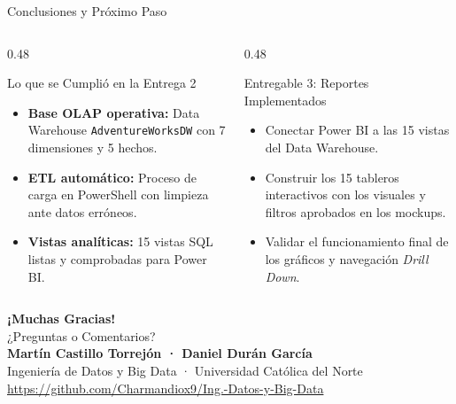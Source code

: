 \documentclass[aspectratio=169, 10pt]{beamer}
\begin{document}
\begin{frame}{Conclusiones y Próximo Paso}
    \begin{columns}[t]
        \begin{column}{0.48\textwidth}
            \begin{block}{Lo que se Cumplió en la Entrega 2}
                \small
                \begin{itemize}
                    \item \textbf{Base OLAP operativa:} Data Warehouse \texttt{AdventureWorksDW} con 7 dimensiones y 5 hechos.
                    \item \textbf{ETL automático:} Proceso de carga en PowerShell con limpieza ante datos erróneos.
                    \item \textbf{Vistas analíticas:} 15 vistas SQL listas y comprobadas para Power BI.
                \end{itemize}
            \end{block}
        \end{column}
        
        \begin{column}{0.48\textwidth}
            \begin{block}{Entregable 3: Reportes Implementados}
                \small
                \begin{itemize}
                    \item Conectar Power BI a las 15 vistas del Data Warehouse.
                    \item Construir los 15 tableros interactivos con los visuales y filtros aprobados en los mockups.
                    \item Validar el funcionamiento final de los gráficos y navegación \textit{Drill Down}.
                \end{itemize}
            \end{block}
        \end{column}
    \end{columns}
\end{frame}

\begin{frame}[plain]
    \centering
    \vspace{1.0cm}
    {\Huge \textbf{\textcolor{ucnblue}{¡Muchas Gracias!}}}\\[0.4cm]
    {\Large ¿Preguntas o Comentarios?}\\[1.2cm]
    
    \textbf{Martín Castillo Torrejón · Daniel Durán García}\\[0.15cm]
    \footnotesize Ingeniería de Datos y Big Data · Universidad Católica del Norte\\[0.4cm]
    \scriptsize \textcolor{gray}{\url{https://github.com/Charmandiox9/Ing.-Datos-y-Big-Data}}
\end{frame}
\end{document}
